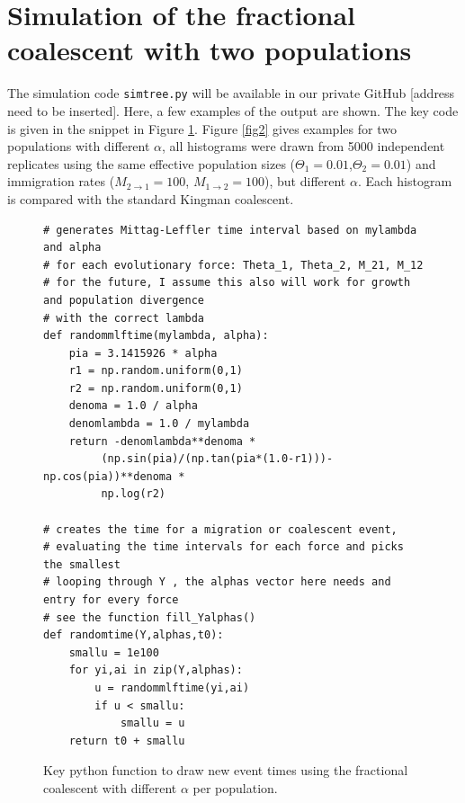 \documentclass{article}
\begin{document}
\section*{Simulation of the fractional coalescent with two populations}
The simulation code \texttt{simtree.py} will be available in our private GitHub [address need to be inserted].
Here, a few examples of the output are shown.
The key code is given in the snippet in Figure \ref{fig1}. Figure \ref{fig2} gives examples for two populations with different $\alpha$, all histograms were drawn from 5000 independent replicates using the same effective population sizes ($\Theta_1=0.01$,$\Theta_2=0.01$) and immigration rates ($M_{2\rightarrow1}=100$, $M_{1\rightarrow2}=100$), but different $\alpha$. Each histogram is compared with the standard Kingman coalescent.
\begin{figure}[h]
\begin{verbatim}
# generates Mittag-Leffler time interval based on mylambda and alpha
# for each evolutionary force: Theta_1, Theta_2, M_21, M_12
# for the future, I assume this also will work for growth and population divergence 
# with the correct lambda 
def randommlftime(mylambda, alpha):
    pia = 3.1415926 * alpha
    r1 = np.random.uniform(0,1)
    r2 = np.random.uniform(0,1)
    denoma = 1.0 / alpha
    denomlambda = 1.0 / mylambda
    return -denomlambda**denoma * 
         (np.sin(pia)/(np.tan(pia*(1.0-r1)))-np.cos(pia))**denoma * 
         np.log(r2)

# creates the time for a migration or coalescent event,
# evaluating the time intervals for each force and picks the smallest
# looping through Y , the alphas vector here needs and entry for every force
# see the function fill_Yalphas()                                                                                                 
def randomtime(Y,alphas,t0):
    smallu = 1e100
    for yi,ai in zip(Y,alphas):
        u = randommlftime(yi,ai)
        if u < smallu:
            smallu = u
    return t0 + smallu
\end{verbatim}
\caption{Key python function to draw new event times using the fractional coalescent with different $\alpha$ per population.}\label{fig1}
\end{figure}
\end{document}
